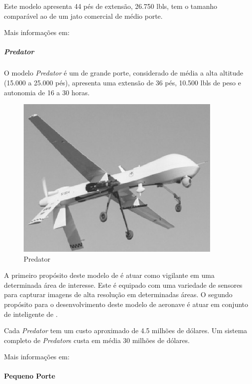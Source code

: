 Este modelo apresenta 44 pés de extensão, 26.750 lbls, tem o tamanho comparável ao de um jato comercial de médio porte. 



Mais informações em:  \cite{Drew2005} \cite{uav_roadmap2005} \cite{ Bone2003} 


\subparagraph{ \emph{Predator} }

 O modelo \emph{Predator} é um \vant  de grande porte, considerado de média a alta altitude (15.000 a 25.000 pés), apresenta 
uma extensão de 36 pés, 10.500 lbls de peso e autonomia de 16 a 30 horas.

\begin{figure}[h!]
\centering
\includegraphics[width=10cm]{pictures/predator.png}
\caption{Predator}
 \label{fig:predator}
\end{figure}

A primeiro propósito deste modelo de \vant é atuar como vigilante em uma determinada área de interesse. Este \vant é equipado com uma variedade de sensores para capturar imagens de alta resolução em determinadas áreas.
O segundo propósito para o desenvolvimento deste modelo de aeronave é atuar em conjunto de inteligente de \uavs. 

Cada \emph{Predator} tem um custo aproximado de 4.5 milhões de dólares. Um sistema completo de \emph{Predator}s custa em média 30 milhões de dólares.

Mais informações em:  \cite{Drew2005} \cite{uav_roadmap2005} \cite{ Bone2003} 



\paragraph{Pequeno Porte}

